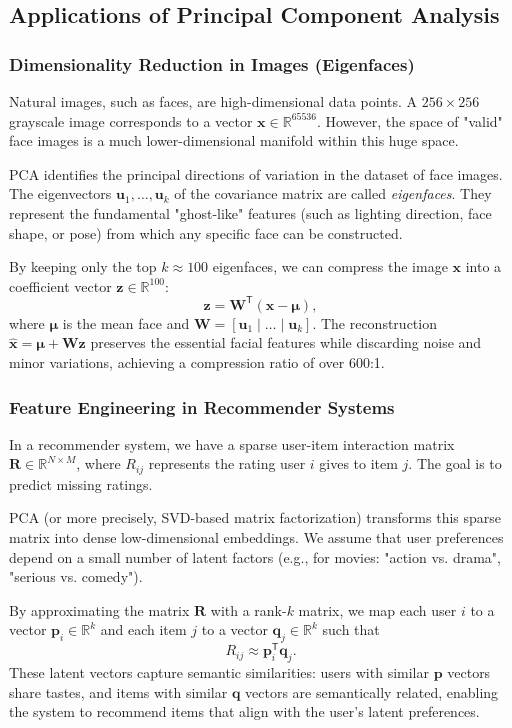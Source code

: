 \subsection{Applications of Principal Component Analysis}

\subsubsection{Dimensionality Reduction in Images (Eigenfaces)}
Natural images, such as faces, are high-dimensional data points. A $256 \times 256$ grayscale image corresponds to a vector $\mathbf{x} \in \mathbb{R}^{65536}$. However, the space of "valid" face images is a much lower-dimensional manifold within this huge space.

PCA identifies the principal directions of variation in the dataset of face images. The eigenvectors $\mathbf{u}_1, \dots, \mathbf{u}_k$ of the covariance matrix are called \emph{eigenfaces}. They represent the fundamental "ghost-like" features (such as lighting direction, face shape, or pose) from which any specific face can be constructed.

By keeping only the top $k \approx 100$ eigenfaces, we can compress the image $\mathbf{x}$ into a coefficient vector $\mathbf{z} \in \mathbb{R}^{100}$:
\[
  \mathbf{z} = \mathbf{W}^{\mathsf{T}}(\mathbf{x} - \boldsymbol{\mu}),
\]
where $\boldsymbol{\mu}$ is the mean face and $\mathbf{W} = [\mathbf{u}_1 \mid \dots \mid \mathbf{u}_k]$. The reconstruction $\widehat{\mathbf{x}} = \boldsymbol{\mu} + \mathbf{W}\mathbf{z}$ preserves the essential facial features while discarding noise and minor variations, achieving a compression ratio of over 600:1.

\subsubsection{Feature Engineering in Recommender Systems}
In a recommender system, we have a sparse user-item interaction matrix $\mathbf{R} \in \mathbb{R}^{N \times M}$, where $R_{ij}$ represents the rating user $i$ gives to item $j$. The goal is to predict missing ratings.

PCA (or more precisely, SVD-based matrix factorization) transforms this sparse matrix into dense low-dimensional embeddings. We assume that user preferences depend on a small number of latent factors (e.g., for movies: "action vs. drama", "serious vs. comedy").

By approximating the matrix $\mathbf{R}$ with a rank-$k$ matrix, we map each user $i$ to a vector $\mathbf{p}_i \in \mathbb{R}^k$ and each item $j$ to a vector $\mathbf{q}_j \in \mathbb{R}^k$ such that
\[
  R_{ij} \approx \mathbf{p}_i^{\mathsf{T}}\mathbf{q}_j.
\]
These latent vectors capture semantic similarities: users with similar $\mathbf{p}$ vectors share tastes, and items with similar $\mathbf{q}$ vectors are semantically related, enabling the system to recommend items that align with the user's latent preferences.

